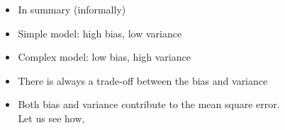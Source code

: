 \begin{frame}
\begin{columns}
\begin{column}{0.4\textwidth}
\begin{figure}
				\caption{}
				\label{fig:simpl}
			\end{figure}
		\end{column}
		\begin{column}{0.6\textwidth}
			\begin{itemize}
				\justifying
				\item<1-> In summary (informally)
				\item<2-> Simple model: high bias, low variance					
				\item<3-> Complex model: low bias, high variance
				\item<4-> There is always a trade-off between the bias and variance
				\item<5-> Both bias and variance contribute to the mean square error. Let us see how,
			\end{itemize}
		\end{column}
	\end{columns}
\end{frame}
